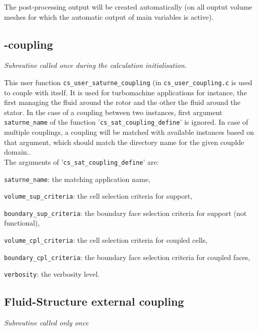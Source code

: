 {{The post-processing output will be created automatically (on all ouptut volume
meshes for which the automatic output of main variables is active).

\subsection{\CS-\CS coupling}

\noindent
\textit{Subroutine called once during the calculation initialisation.}

This user function \texttt{cs\_user\_saturne\_coupling} (in
 \texttt{cs\_user\_coupling.c} is used to couple \CS with itself.
 It is used for turbomachine applications for instance, the first \CS managing
 the fluid around the rotor and the other the fluid around the stator.
In the case of a coupling between two \CS instances, first argument \texttt{saturne\_name}
 of the function '\texttt{cs\_sat\_coupling\_define}' is ignored.
 In case of multiple couplings, a coupling will be matched with available \CS
 instances based on that argument, which should match the directory name for the
 given couplde domain..\\
The arguments of '\texttt{cs\_sat\_coupling\_define}' are:
\begin{list}{-}{}
\item \texttt{saturne\_name}: the matching \CS application name,
\item \texttt{volume\_sup\_criteria}: the cell selection criteria for support,
\item \texttt{boundary\_sup\_criteria}: the boundary face selection criteria for support (not functional),
\item \texttt{volume\_cpl\_criteria}: the cell selection criteria for coupled cells,
\item \texttt{boundary\_cpl\_criteria}: the boundary face selection criteria for coupled faces,
\item \texttt{verbosity}: the verbosity level.
\end{list}


\subsection{Fluid-Structure external coupling}

\noindent
\textit{Subroutine called only once}

}}
